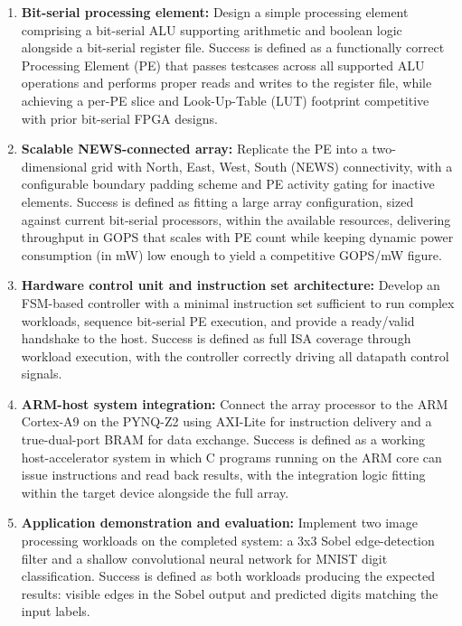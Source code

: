         \begin{enumerate}
        
        \item \textbf{Bit-serial processing element:}\label{item:obj1} Design a simple processing element comprising a bit-serial ALU supporting arithmetic and boolean logic alongside a bit-serial register file. Success is defined as a functionally correct Processing Element (PE) that passes testcases across all supported ALU operations and performs proper reads and writes to the register file, while achieving a per-PE slice and Look-Up-Table (LUT) footprint competitive with prior bit-serial FPGA designs.
        
        \item \textbf{Scalable NEWS-connected array:}\label{item:obj2} Replicate the PE into a two-dimensional grid with North, East, West, South (NEWS) connectivity, with a configurable boundary padding scheme and PE activity gating for inactive elements. Success is defined as fitting a large array configuration, sized against current bit-serial processors, within the available resources, delivering throughput in GOPS that scales with PE count while keeping dynamic power consumption (in mW) low enough to yield a competitive GOPS/mW figure.
        
        \item \textbf{Hardware control unit and instruction set architecture:}\label{item:obj3} Develop an FSM-based controller with a minimal instruction set sufficient to run complex workloads, sequence bit-serial PE execution, and provide a ready/valid handshake to the host. Success is defined as full ISA coverage through workload execution, with the controller correctly driving all datapath control signals.
        
        \item \textbf{ARM-host system integration:}\label{item:obj4} Connect the array processor to the ARM Cortex-A9 on the PYNQ-Z2 using AXI-Lite for instruction delivery and a true-dual-port BRAM for data exchange. Success is defined as a working host-accelerator system in which C programs running on the ARM core can issue instructions and read back results, with the integration logic fitting within the target device alongside the full array.
        
        \item \textbf{Application demonstration and evaluation:}\label{item:obj5} Implement two image processing workloads on the completed system: a 3x3 Sobel edge-detection filter and a shallow convolutional neural network for MNIST digit classification. Success is defined as both workloads producing the expected results: visible edges in the Sobel output and predicted digits matching the input labels.
        
        \end{enumerate}
    
